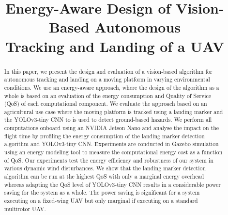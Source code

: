 \documentclass[conference]{IEEEtran}
\begin{document}
\title{Energy-Aware Design of Vision-Based Autonomous\\Tracking and Landing of a UAV} 

\author{
}

\maketitle


\begin{abstract}


In this paper, we present the design and evaluation of a
vision-based algorithm for autonomous tracking and landing on a moving platform 
in varying environmental conditions. %
%
We use an energy-aware approach, where the design of the algorithm as a whole is based on
an evaluation of the energy consumption and Quality of Service (QoS) of each computational component.
%
We evaluate the approach based on an agricultural use case where
the moving platform is tracked using 
a landing marker %
and the YOLOv3-tiny CNN to is used to detect ground-based hazards. We
perform all computations onboard using an NVIDIA Jetson Nano and analyse the impact on the flight time by profiling the energy consumption of the
landing marker detection algorithm and YOLOv3-tiny CNN. Experiments are conducted in Gazebo simulation using an energy modeling tool to measure the computational energy cost as a function of QoS. Our experiments test the energy efficiency and robustness of our system in various dynamic wind disturbances. We show that the landing marker detection algorithm can be run at the highest QoS with only a marginal energy overhead whereas adapting the QoS level of YOLOv3-tiny CNN results in a considerable power saving for the system as a whole. The
power saving is significant for a system executing on a fixed-wing UAV but only marginal if executing on a standard multirotor UAV.

\end{abstract}

%
\IEEEpeerreviewmaketitle
\end{document}
